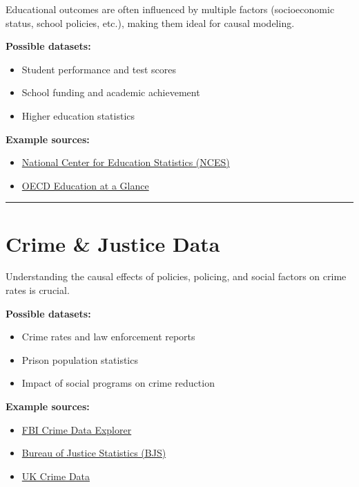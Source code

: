 \documentclass[
  letterpaper,
  DIV=11,
  numbers=noendperiod]{scrreprt}
\begin{document}
Educational outcomes are often influenced by multiple factors
(socioeconomic status, school policies, etc.), making them ideal for
causal modeling.

\textbf{Possible datasets:}

\begin{itemize}
\item
  Student performance and test scores
\item
  School funding and academic achievement
\item
  Higher education statistics
\end{itemize}

\textbf{Example sources:}

\begin{itemize}
\item
  \href{https://nces.ed.gov/}{National Center for Education Statistics
  (NCES)}
\item
  \href{https://www.oecd.org/en/publications/education-at-a-glance-2024_c00cad36-en.html}{OECD
  Education at a Glance}
\end{itemize}

\begin{center}\rule{0.5\linewidth}{0.5pt}\end{center}

\section{\texorpdfstring{\textbf{Crime \& Justice
Data}}{Crime \& Justice Data}}\label{crime-justice-data}

Understanding the causal effects of policies, policing, and social
factors on crime rates is crucial.

\textbf{Possible datasets:}

\begin{itemize}
\item
  Crime rates and law enforcement reports
\item
  Prison population statistics
\item
  Impact of social programs on crime reduction
\end{itemize}

\textbf{Example sources:}

\begin{itemize}
\item
  \href{https://cde.ucr.cjis.gov/}{FBI Crime Data Explorer}
\item
  \href{https://bjs.ojp.gov/}{Bureau of Justice Statistics (BJS)}
\item
  \href{https://data.police.uk/}{UK Crime Data}
\end{itemize}
\end{document}
